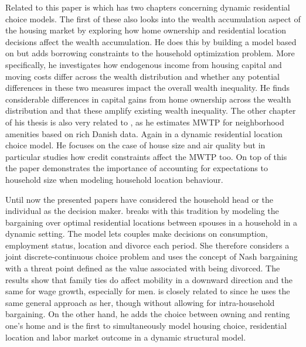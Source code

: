 Related to this paper is \citet{Hviid2015} which has two chapters concerning dynamic residential choice models. The first of these also looks into the wealth accumulation aspect of the housing market by exploring how home ownership and residential location decisions affect the wealth accumulation. He does this by building a model based on \citet{Bayer2016} but adds borrowing constraints to the household optimization problem. More specifically, he investigates how endogenous income from housing capital and moving costs differ across the wealth distribution and whether any potential differences in these two measures impact the overall wealth inequality. He finds considerable differences in capital gains from home ownership across the wealth distribution and that these amplify existing wealth inequality. The other chapter of his thesis is also very related to \citet{Bayer2016}, as he estimates MWTP for neighborhood amenities based on rich Danish data. Again in a dynamic residential location choice model. He focuses on the case of house size and air quality but in particular studies how credit constraints affect the MWTP too. On top of this the paper demonstrates the importance of accounting for expectations to household size when modeling household location behaviour. 

Until now the presented papers have considered the household head or the individual as the decision maker. \citet{Gemici2011} breaks with this tradition by modeling the bargaining over optimal residential locations between spouses in a household in a dynamic setting. The model lets couples make decisions on consumption, employment status, location and divorce each period. She therefore considers a joint discrete-continuous choice problem and uses the concept of Nash bargaining with a threat point defined as the value associated with being divorced. The results show that family ties do affect mobility in a downward direction and the same for wage growth, especially for men. \citet{Winkler2011} is closely related to \citet{Gemici2011} since he uses the same general approach as her, though without allowing for intra-household bargaining. On the other hand, he adds the choice between owning and renting one's home and is the first to simultaneously model housing choice, residential location and labor market outcome in a dynamic structural model. 

